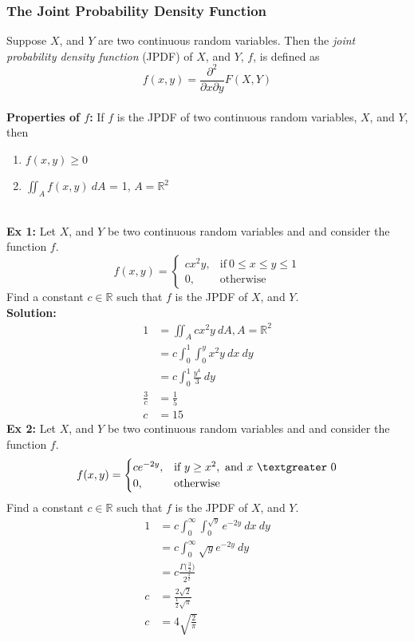 \documentclass{article}
\newcommand{\ti}[1]{\textit{#1}}
\newcommand{\tb}[1]{\textbf{#1}}
\newcommand{\R}{\mathbb{R}}
\newcommand{\gt}{\textgreater}
\newcommand{\Ga}{\Gamma}
\newcommand{\exxi}{\textbf{Ex 1: }}
\newcommand{\exxii}{\textbf{Ex 2:  }}
\newcommand{\soln}{\textbf{Solution: }}
\begin{document}
\subsubsection{The Joint Probability Density Function}
Suppose $X$, and $Y$ are two continuous random variables. Then the \ti{joint probability density function} (JPDF) of $X$, and $Y$, $f$, is defined as
\[f(x, y) = \frac{\partial^2}{\partial x\partial y}F(X, Y)\]\\
\tb{Properties of $f$:} If $f$ is the JPDF of two continuous random variables, $X$, and $Y$, then
\begin{enumerate}
	\item $f(x, y) \geq 0$
	\item $\iint_{A} f(x, y)\ dA$ = 1, $A=\R^{2}$
\end{enumerate}
\ \\
\exxi Let $X$, and $Y$ be two continuous random variables and and consider the function $f$. 
\[
f(x, y) =
\begin{cases}
	cx^{2}y, &\text{if}\ 0\leq x \leq y \leq 1\\
	0, &\text{otherwise}
\end{cases}
\]
Find a constant $c \in \R$ such that $f$ is the JPDF of $X$, and $Y$.\\
\soln
\begin{align*}
	1 &= \iint_{A} cx^2y\ dA, A = \R^{2}\\
	&= c\int_{0}^{1}\int_{0}^{y}x^2y\ dx\ dy\\
	&= c\int_{0}^{1} \frac{y^{4}}{3}\ dy\\
	\frac{3}{c}&= \frac{1}{5}\\
	c &= 15
\end{align*}
\exxii Let $X$, and $Y$ be two continuous random variables and and consider the function $f$.
\[
f(x, y) =
\begin{cases}
	ce^{-2y}, &\text{if}\ y\geq x^{2},\ \text{and}\ x\ \gt\ 0\\
	0, &\text{otherwise}
\end{cases}
\]
Find a constant $c \in \R$ such that $f$ is the JPDF of $X$, and $Y$.\\
\begin{align*}
	1 &= c\int_{0}^{\infty}\int_{0}^{\sqrt{y}}e^{-2y}\ dx\ dy\\
	&= c\int_{0}^{\infty} \sqrt{y}e^{-2y}\ dy\\
	&= c\frac{\Ga\big(\frac{3}{2}\big)}{2^{\frac{3}{2}}}\\
	c &= \frac{2\sqrt{2}}{\frac{1}{2}\sqrt{\pi}}\\
	c &= 4\sqrt{\frac{2}{\pi}}
\end{align*}
\newpage
\end{document}
